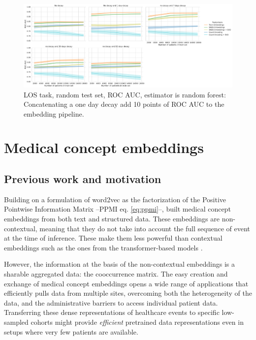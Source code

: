 \documentclass[french,12pt,twoside,a4paper]{book}
\begin{document}
\begin{appendices}
  \begin{figure}[!h]
    \centering
    \includegraphics[width=\textwidth]{img/chapter_3/random_split_los_decay_vibration_roc_auc.pdf}
    \caption{LOS task, random test set, ROC AUC, estimator is random forest:
      Concatenating a one day decay add 10 points of ROC AUC to the embedding
      pipeline.}\label{apd:fig:vibration_decay}
  \end{figure}


  \section{Medical concept embeddings}\label{apd:medical_concept_embeddings}

  \subsection{Previous work and motivation}\label{apd:medical_concept_embeddings:previous_work}

  Building on a formulation of word2vec \citep{mikolov2013distributed} as the
  factorization of the Positive Pointwise Information Matrix --PPMI eq.
  \ref{eq:ppmi}--, \citet{beam2019clinical} built medical concept embeddings from
  both text and structured data. These embeddings are non-contextual, meaning that
  they do not take into account the full sequence of event at the time of
  inference. These make them less powerful than contextual embeddings such as the ones from
  the transformer-based models \citep{li2020behrt, rasmy2021med, pang2021cehr}.

  However, the information at the basis of the non-contextual embeddings is a
  sharable aggregated data: the cooccurrence matrix. The easy creation and
  exchange of medical concept embeddings opens a wide range of applications that
  efficiently pulls data from multiple sites, overcoming both the heterogeneity of
  the data, and the administrative barriers to access individual patient data.
  Transferring these dense representations of healthcare events to specific
  low-sampled cohorts might provide \textit{efficient} pretrained data
  representations even in setups where very few patients are available.



\end{appendices}
\end{document}

